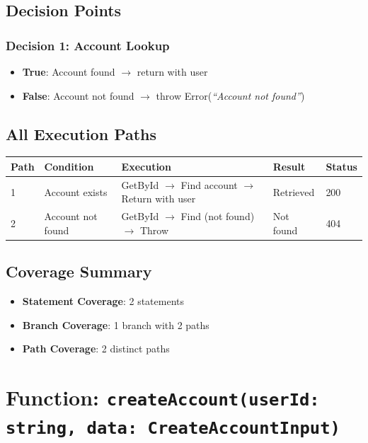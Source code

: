 \subsection{Decision Points}

\subsubsection{Decision 1: Account Lookup}
\begin{itemize}
    \item \textbf{True}: Account found $\rightarrow$ return with user
    \item \textbf{False}: Account not found $\rightarrow$ throw Error(\textit{``Account not found''})
\end{itemize}

\subsection{All Execution Paths}

\begin{longtable}{|L{0.8cm}|L{3cm}|L{5.5cm}|L{2.5cm}|L{1.2cm}|}
\hline
\textbf{Path} & \textbf{Condition} & \textbf{Execution} & \textbf{Result} & \textbf{Status} \\
 & Account exists & GetById $\rightarrow$ Find account $\rightarrow$ Return with user & Retrieved & 200 \\
 & Account not found & GetById $\rightarrow$ Find (not found) $\rightarrow$ Throw & Not found & 404 \\
\hline
\end{longtable}

\subsection{Coverage Summary}
\begin{itemize}
    \item \textbf{Statement Coverage}: 2 statements
    \item \textbf{Branch Coverage}: 1 branch with 2 paths
    \item \textbf{Path Coverage}: 2 distinct paths
\end{itemize}

\section{Function: \texttt{createAccount(userId: string, data: CreateAccountInput)}}

